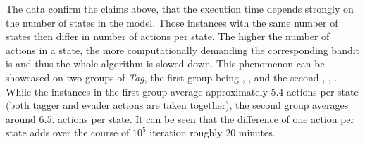 \documentclass[../main.tex]{subfiles}
\begin{document}
The data confirm the claims above, that the execution time depends strongly on the number of states in the model.
Those instances with the same number of states then differ in number of actions per state.
The higher the number of actions in a state, the more computationally demanding the corresponding bandit is and thus the whole algorithm is slowed down.
This phenomenon can be showcased on two groups of \textit{Tag}, the first group being , ,  and the second , , .
While the instances in the first group average approximately $5.4$ actions per state (both tagger and evader actions are taken together), the second group averages around $6.5$. actions per state.
It can be seen that the difference of one action per state adds over the course of $10^5$ iteration roughly $20$ minutes.
\end{document}
